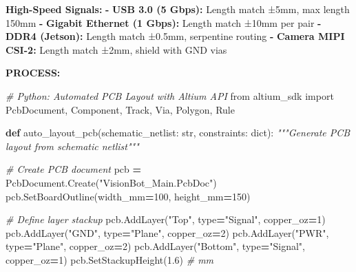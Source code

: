 \documentclass[
]{article}
\newenvironment{Shaded}{\begin{snugshade}}{\end{snugshade}}
\newcommand{\AttributeTok}[1]{\textcolor[rgb]{0.13,0.29,0.53}{#1}}
\newcommand{\BuiltInTok}[1]{#1}
\newcommand{\CommentTok}[1]{\textcolor[rgb]{0.56,0.35,0.01}{\textit{#1}}}
\newcommand{\DecValTok}[1]{\textcolor[rgb]{0.00,0.00,0.81}{#1}}
\newcommand{\FloatTok}[1]{\textcolor[rgb]{0.00,0.00,0.81}{#1}}
\newcommand{\FunctionTok}[1]{\textcolor[rgb]{0.13,0.29,0.53}{\textbf{#1}}}
\newcommand{\ImportTok}[1]{#1}
\newcommand{\KeywordTok}[1]{\textcolor[rgb]{0.13,0.29,0.53}{\textbf{#1}}}
\newcommand{\NormalTok}[1]{#1}
\newcommand{\OperatorTok}[1]{\textcolor[rgb]{0.81,0.36,0.00}{\textbf{#1}}}
\newcommand{\StringTok}[1]{\textcolor[rgb]{0.31,0.60,0.02}{#1}}
\begin{document}
\begin{Shaded}
\begin{Highlighting}[]
\FunctionTok{High{-}Speed Signals}\KeywordTok{:}
\AttributeTok{  }\KeywordTok{{-}}\AttributeTok{ }\FunctionTok{USB 3.0 (5 Gbps)}\KeywordTok{:}\AttributeTok{ Length match ±5mm, max length 150mm}
\AttributeTok{  }\KeywordTok{{-}}\AttributeTok{ }\FunctionTok{Gigabit Ethernet (1 Gbps)}\KeywordTok{:}\AttributeTok{ Length match ±10mm per pair}
\AttributeTok{  }\KeywordTok{{-}}\AttributeTok{ }\FunctionTok{DDR4 (Jetson)}\KeywordTok{:}\AttributeTok{ Length match ±0.5mm, serpentine routing}
\AttributeTok{  }\KeywordTok{{-}}\AttributeTok{ }\FunctionTok{Camera MIPI CSI{-}2}\KeywordTok{:}\AttributeTok{ Length match ±2mm, shield with GND vias}
\end{Highlighting}
\end{Shaded}

\textbf{PROCESS:}

\begin{Shaded}
\begin{Highlighting}[]
\CommentTok{\# Python: Automated PCB Layout with Altium API}
\ImportTok{from}\NormalTok{ altium\_sdk }\ImportTok{import}\NormalTok{ PcbDocument, Component, Track, Via, Polygon, Rule}

\KeywordTok{def}\NormalTok{ auto\_layout\_pcb(schematic\_netlist: }\BuiltInTok{str}\NormalTok{, constraints: }\BuiltInTok{dict}\NormalTok{):}
    \CommentTok{"""Generate PCB layout from schematic netlist"""}

    \CommentTok{\# Create PCB document}
\NormalTok{    pcb }\OperatorTok{=}\NormalTok{ PcbDocument.Create(}\StringTok{"VisionBot\_Main.PcbDoc"}\NormalTok{)}
\NormalTok{    pcb.SetBoardOutline(width\_mm}\OperatorTok{=}\DecValTok{100}\NormalTok{, height\_mm}\OperatorTok{=}\DecValTok{150}\NormalTok{)}

    \CommentTok{\# Define layer stackup}
\NormalTok{    pcb.AddLayer(}\StringTok{"Top"}\NormalTok{, }\BuiltInTok{type}\OperatorTok{=}\StringTok{"Signal"}\NormalTok{, copper\_oz}\OperatorTok{=}\DecValTok{1}\NormalTok{)}
\NormalTok{    pcb.AddLayer(}\StringTok{"GND"}\NormalTok{, }\BuiltInTok{type}\OperatorTok{=}\StringTok{"Plane"}\NormalTok{, copper\_oz}\OperatorTok{=}\DecValTok{2}\NormalTok{)}
\NormalTok{    pcb.AddLayer(}\StringTok{"PWR"}\NormalTok{, }\BuiltInTok{type}\OperatorTok{=}\StringTok{"Plane"}\NormalTok{, copper\_oz}\OperatorTok{=}\DecValTok{2}\NormalTok{)}
\NormalTok{    pcb.AddLayer(}\StringTok{"Bottom"}\NormalTok{, }\BuiltInTok{type}\OperatorTok{=}\StringTok{"Signal"}\NormalTok{, copper\_oz}\OperatorTok{=}\DecValTok{1}\NormalTok{)}
\NormalTok{    pcb.SetStackupHeight(}\FloatTok{1.6}\NormalTok{)  }\CommentTok{\# mm}


\end{Highlighting}
\end{Shaded}
\end{document}
